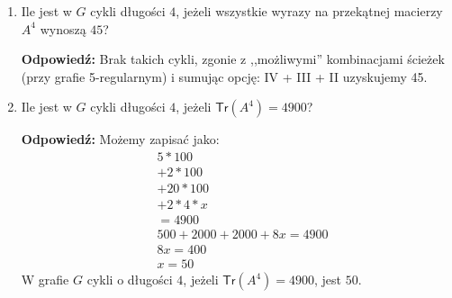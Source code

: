 \begin{enumerate}[label=\alph*)]
\item Ile jest w $G$ cykli długości $4$, jeżeli wszystkie wyrazy na przekątnej	macierzy $A^4$ wynoszą $45$?

\textbf{Odpowiedź: }Brak takich cykli, zgonie z ,,możliwymi'' kombinacjami ścieżek (przy grafie 5-regularnym) i sumując opcję: IV + III + II uzyskujemy 45.
\item Ile jest w $G$ cykli długości $4$, jeżeli $\mathsf{Tr}(A^4) = 4900$?

\textbf{Odpowiedź: }Możemy zapisać jako:
\begin{align*}
& 5*100 \tag*{Zgodnie z możliwą ścieżką nr IV}\\ 
&+ 2*100 \tag*{ścieżka nr III}\\ 
&+ 20*100 \tag*{ścieżka nr II}\\ 
&+ 2*4*x \tag*{ścieżka nr I i poszukiwana wartość $x$ - liczba cykli} \\ 
&= 4900\\
& 500+2000+2000+8x=4900 \\
& 8x = 400\\
& x = 50
\end{align*}
W grafie $G$ cykli o długości $4$, jeżeli $\mathsf{Tr}(A^4) = 4900$, jest $50$.
\end{enumerate}

